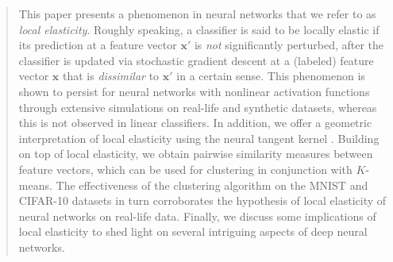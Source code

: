 \documentclass[11pt]{article}
\newcommand{\bx}{\mbf{x}}
\newcommand{\mbf}[1]{\bm{#1}}
\begin{document}
\begin{abstract}


This paper presents a phenomenon in neural networks that we refer to as \textit{local elasticity}. Roughly speaking, a classifier is said to be locally elastic if its prediction at a feature vector $\bx'$ is \textit{not} significantly perturbed, after the classifier is updated via stochastic gradient descent at a (labeled) feature vector $\bx$ that is \textit{dissimilar} to $\bx'$ in a certain sense. This phenomenon is shown to persist for neural networks with nonlinear activation functions through extensive simulations on real-life and synthetic datasets, whereas this is not observed in linear classifiers. In addition, we offer a geometric interpretation of local elasticity using the neural tangent kernel \citep{jacot2018neural}. Building on top of local elasticity, we obtain pairwise similarity measures between feature vectors, which can be used for clustering in conjunction with $K$-means. The effectiveness of the clustering algorithm on the MNIST and CIFAR-10 datasets in turn corroborates the hypothesis of local elasticity of neural networks on real-life data. Finally, we discuss some implications of local elasticity to shed light on several intriguing aspects of deep neural networks.


\end{abstract}
\end{document}
